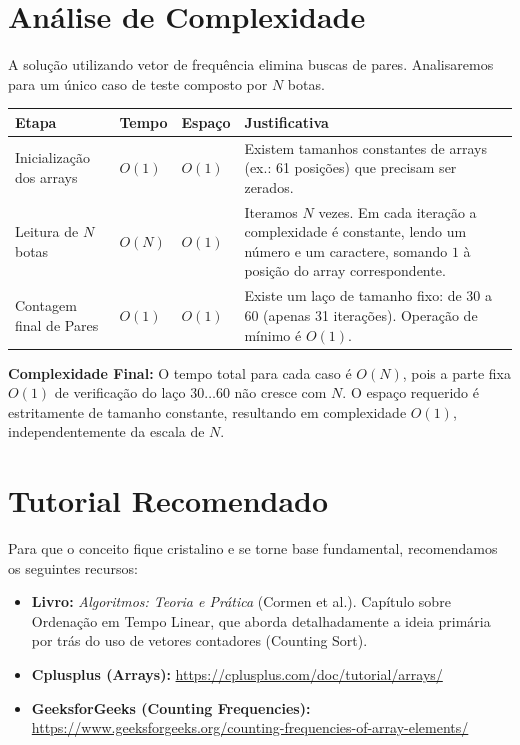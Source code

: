 \documentclass[11pt]{article}
\begin{document}
\section{Análise de Complexidade}

A solução utilizando vetor de frequência elimina buscas de pares. Analisaremos para um único caso de teste composto por $N$ botas.

\begin{table}[h]
    \centering
    \renewcommand{\arraystretch}{1.2}
    \begin{tabularx}{\textwidth}{>{\raggedright\arraybackslash}p{5.5cm} >{\centering\arraybackslash}p{3cm} >{\centering\arraybackslash}p{3cm} X}
        \toprule
        \textbf{Etapa} & \textbf{Tempo} & \textbf{Espaço} & \textbf{Justificativa} \\
        \midrule
        Inicialização dos arrays & $O(1)$ & $O(1)$ & Existem tamanhos constantes de arrays (ex.: 61 posições) que precisam ser zerados. \\
        \midrule
        Leitura de $N$ botas & $O(N)$ & $O(1)$ & Iteramos $N$ vezes. Em cada iteração a complexidade é constante, lendo um número e um caractere, somando $1$ à posição do array correspondente. \\
        \midrule
        Contagem final de Pares & $O(1)$ & $O(1)$ & Existe um laço de tamanho fixo: de 30 a 60 (apenas 31 iterações). Operação de mínimo é $O(1)$. \\
        \bottomrule
    \end{tabularx}
\end{table}

\textbf{Complexidade Final:} O tempo total para cada caso é $O(N)$, pois a parte fixa $O(1)$ de verificação do laço $30 \dots 60$ não cresce com $N$. O espaço requerido é estritamente de tamanho constante, resultando em complexidade $O(1)$, independentemente da escala de $N$.

\section{Tutorial Recomendado}

\begin{notebox}
Para que o conceito fique cristalino e se torne base fundamental, recomendamos os seguintes recursos:
\begin{itemize}
    \item \textbf{Livro:} \textit{Algoritmos: Teoria e Prática} (Cormen et al.). Capítulo sobre Ordenação em Tempo Linear, que aborda detalhadamente a ideia primária por trás do uso de vetores contadores (Counting Sort).
    \item \textbf{Cplusplus (Arrays):} \url{https://cplusplus.com/doc/tutorial/arrays/}
    \item \textbf{GeeksforGeeks (Counting Frequencies):} \url{https://www.geeksforgeeks.org/counting-frequencies-of-array-elements/}
\end{itemize}
\end{notebox}

\end{document}
